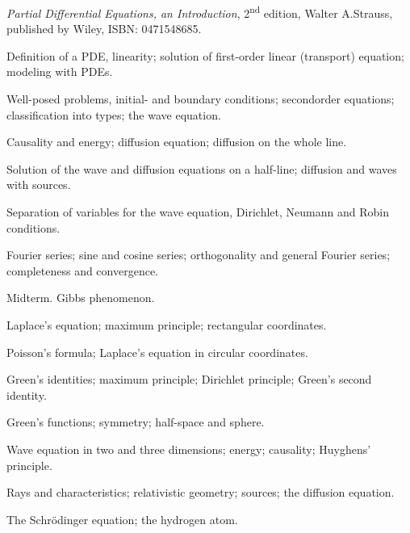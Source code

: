 \documentclass{osucourse}
\begin{document}
\CatalogDescription
\PrerequisitesAndExclusions

\begin{Text}
\emph{Partial Differential Equations, an Introduction}, 2\textsuperscript{nd} edition,
Walter A.Strauss, published by Wiley, ISBN: 0471548685.
\end{Text}

\begin{TopicsList}
\item
  Definition of a PDE, linearity; solution of first-order linear
  (transport) equation; modeling with PDEs.
\item
  Well-posed problems, initial- and boundary conditions; secondorder
  equations; classification into types; the wave equation.
\item
  Causality and energy; diffusion equation; diffusion on the whole line.
\item
  Solution of the wave and diffusion equations on a half-line; diffusion
  and waves with sources.
\item
  Separation of variables for the wave equation, Dirichlet, Neumann and
  Robin conditions.
\item
  Fourier series; sine and cosine series; orthogonality and general
  Fourier series; completeness and convergence.
\item
  Midterm. Gibbs phenomenon.
\item
  Laplace's equation; maximum principle; rectangular coordinates.
\item
  Poisson's formula; Laplace's equation in circular coordinates.
\item
  Green's identities; maximum principle; Dirichlet principle; Green's
  second identity.
\item
  Green's functions; symmetry; half-space and sphere.
\item
  Wave equation in two and three dimensions; energy; causality;
  Huyghens' principle.
\item
  Rays and characteristics; relativistic geometry; sources; the
  diffusion equation.
\item
  The Schrödinger equation; the hydrogen atom.
\end{TopicsList}
\end{document}
